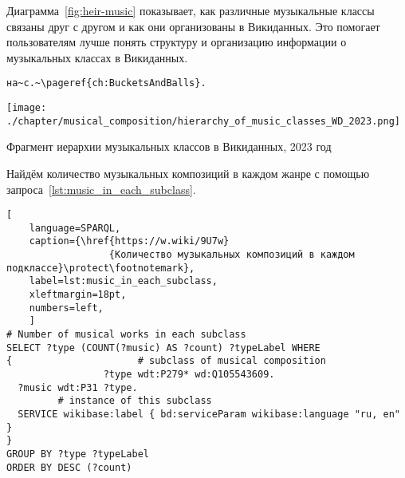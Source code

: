 Диаграмма~\ref{fig:heir-music} показывает, как различные музыкальные классы связаны друг с другом и как они организованы в Викиданных. Это помогает пользователям лучше понять структуру и организацию информации о музыкальных классах в Викиданных.

\begin{verbatim}
на~с.~\pageref{ch:BucketsAndBalls}. 
\end{verbatim}




\begin{marginfigure}[0\baselineskip]
	\texttt{[image: ./chapter/musical\_composition/hierarchy\_of\_music\_classes\_WD\_2023.png]}
	\caption[Иерархия музыкальных классов]{Фрагмент иерархии музыкальных классов в Викиданных, 2023 год}%
	\label{fig:hier-music}%
\end{marginfigure}
Найдём количество музыкальных композиций в каждом жанре с помощью запроса~\ref{lst:music_in_each_subclass}.

\begin{lstlisting}[ 
    language=SPARQL,
    caption={\href{https://w.wiki/9U7w}
                  {Количество музыкальных композиций в каждом подклассе}\protect\footnotemark},
    label=lst:music_in_each_subclass,
    xleftmargin=18pt,
    numbers=left,
    ]
# Number of musical works in each subclass
SELECT ?type (COUNT(?music) AS ?count) ?typeLabel WHERE 
{                      # subclass of musical composition
                 ?type wdt:P279* wd:Q105543609.      
  ?music wdt:P31 ?type.
         # instance of this subclass
  SERVICE wikibase:label { bd:serviceParam wikibase:language "ru, en" }
}
GROUP BY ?type ?typeLabel
ORDER BY DESC (?count)
\end{lstlisting}%


